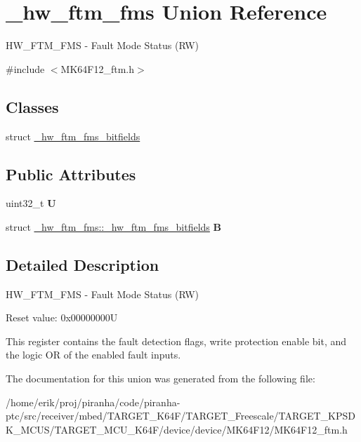 \hypertarget{union__hw__ftm__fms}{}\section{\+\_\+hw\+\_\+ftm\+\_\+fms Union Reference}
\label{union__hw__ftm__fms}


H\+W\+\_\+\+F\+T\+M\+\_\+\+F\+MS -\/ Fault Mode Status (RW)  




{\ttfamily \#include $<$M\+K64\+F12\+\_\+ftm.\+h$>$}

\subsection*{Classes}
\begin{DoxyCompactItemize}
\item 
struct \hyperlink{struct__hw__ftm__fms_1_1__hw__ftm__fms__bitfields}{\+\_\+hw\+\_\+ftm\+\_\+fms\+\_\+bitfields}
\end{DoxyCompactItemize}
\subsection*{Public Attributes}
\begin{DoxyCompactItemize}
\item 
uint32\+\_\+t {\bfseries U}\hypertarget{union__hw__ftm__fms_a6e213878e2232b7793846b6a24efb403}{}\label{union__hw__ftm__fms_a6e213878e2232b7793846b6a24efb403}

\item 
struct \hyperlink{struct__hw__ftm__fms_1_1__hw__ftm__fms__bitfields}{\+\_\+hw\+\_\+ftm\+\_\+fms\+::\+\_\+hw\+\_\+ftm\+\_\+fms\+\_\+bitfields} {\bfseries B}\hypertarget{union__hw__ftm__fms_a897a6865ffbb585b41164431b50d0e97}{}\label{union__hw__ftm__fms_a897a6865ffbb585b41164431b50d0e97}

\end{DoxyCompactItemize}


\subsection{Detailed Description}
H\+W\+\_\+\+F\+T\+M\+\_\+\+F\+MS -\/ Fault Mode Status (RW) 

Reset value\+: 0x00000000U

This register contains the fault detection flags, write protection enable bit, and the logic OR of the enabled fault inputs. 

The documentation for this union was generated from the following file\+:\begin{DoxyCompactItemize}
\item 
/home/erik/proj/piranha/code/piranha-\/ptc/src/receiver/mbed/\+T\+A\+R\+G\+E\+T\+\_\+\+K64\+F/\+T\+A\+R\+G\+E\+T\+\_\+\+Freescale/\+T\+A\+R\+G\+E\+T\+\_\+\+K\+P\+S\+D\+K\+\_\+\+M\+C\+U\+S/\+T\+A\+R\+G\+E\+T\+\_\+\+M\+C\+U\+\_\+\+K64\+F/device/device/\+M\+K64\+F12/M\+K64\+F12\+\_\+ftm.\+h\end{DoxyCompactItemize}
